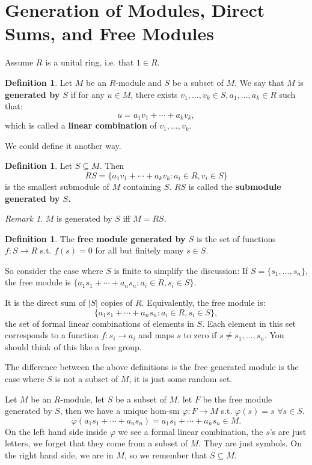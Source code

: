 \documentclass[12pt]{amsbook}
\theoremstyle{plain}
\numberwithin{section}{chapter}
\numberwithin{equation}{chapter}
\theoremstyle{definition}
\newtheorem{Def}[theorem]{Definition}
\theoremstyle{remark}
\newtheorem{rem}[theorem]{Remark}
\newcommand{\sub}{\subseteq}
\renewcommand{\phi}{\varphi}
\begin{document}
\section{Generation of Modules, Direct Sums, and Free Modules}


Assume $R$ is a unital ring, i.e. that $1 \in R$. 
\begin{Def}
Let $M$ be an $R$-module and $S$ be a subset of $M$. We say that $M$ is \textbf{generated by $S$} if for any $u \in M$, there exists $v_1,...,v_k \in S, a_1,...,a_k \in R$ such that:
$$
u = a_1v_1 + \cdots + a_kv_k,
$$
which is called a \textbf{linear combination} of $v_1,...,v_k$. 
\end{Def}

We could define it another way. 
\begin{Def}
Let $S \sub M$. Then 
$$
RS = \{a_1v_1 + \cdots + a_kv_k: a_i\in R, v_i \in S\}
$$
is the smallest submodule of $M$ containing $S$. $RS$ is called the \textbf{submodule generated by $S$. }
\end{Def}

\begin{rem}
$M$ is generated by $S$ iff $M = RS$. 
\end{rem}

\begin{Def}
The \textbf{free module generated by $S$} is the set of functions $f:S \to R$ s.t. $f(s) = 0$ for all but finitely many $s \in S$. 
\end{Def}
So consider the case where $S$ is finite to simplify the discussion: If $S = \{s_1,...,s_n\}$, the free module is $\{a_1s_1+ \cdots + a_ns_n: a_i \in R,s_i \in S\}$. 


It is the direct sum of $|S|$ copies of $R$. Equivalently, the free module is:
$$
\{a_1s_1 + \cdots + a_ns_n:a_i \in R, s_i \in S\},
$$
the set of formal linear combinations of elements in $S$. Each element in this set corresponds to a function $f:s_i \to a_i$ and maps $s$ to zero if $s \neq s_1,...,s_n$. You should think of this like a free group. 

The difference between the above definitions is the free generated module is the case where $S$ is not a subset of $M$, it is just some random set. 

Let $M$ be an $R$-module, let $S$ be a subset of $M$. let $F$ be the free module generated by $S$, then we have a unique hom-sm $\phi:F \to M$ s.t. $\phi(s) = s$ $\forall s \in S$. 
$$
\phi(a_1s_1 + \cdots + a_ns_n) = a_1s_1 + \cdots + a_ns_n \in M.
$$
On the left hand side inside $\phi$ we see a formal linear combination, the $s$'s are just letters, we forget that they come from a subset of $M$. They are just symbols. On the right hand side, we are in $M$, so we remember that $S \sub M$. 
\end{document}
